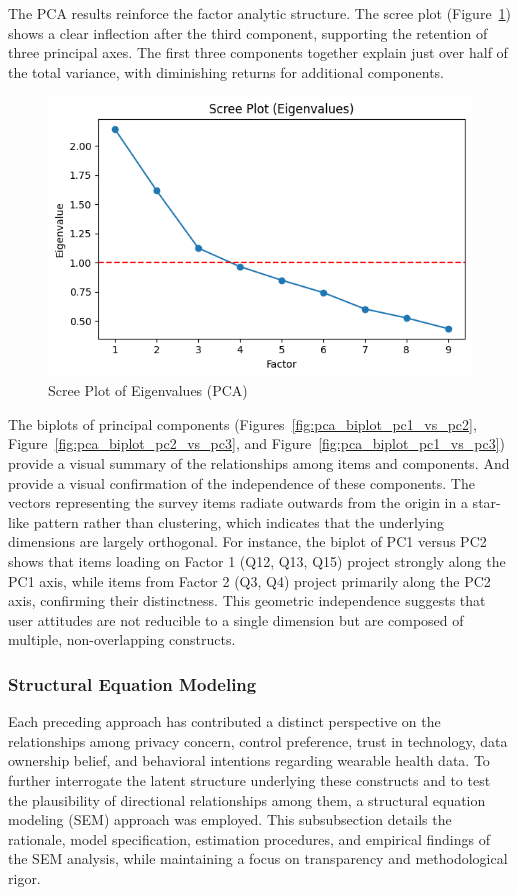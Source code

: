 	The PCA results reinforce the factor analytic structure. The scree plot (Figure~\ref{fig:scree_plot}) shows a clear inflection after the third component, supporting the retention of three principal axes. The first three components together explain just over half of the total variance, with diminishing returns for additional components.
	\begin{figure}[ht]\centering
		\includegraphics[width=0.7\linewidth]{figures/img/factor_analysis/scree_plot.png}
		\caption{Scree Plot of Eigenvalues (PCA)}
		\label{fig:scree_plot}
	\end{figure}
	The biplots of principal components (Figures~\ref{fig:pca_biplot_pc1_vs_pc2}, Figure~\ref{fig:pca_biplot_pc2_vs_pc3}, and Figure~\ref{fig:pca_biplot_pc1_vs_pc3}) provide a visual summary of the relationships among items and components. And provide a visual confirmation of the independence of these components. The vectors representing the survey items radiate outwards from the origin in a star-like pattern rather than clustering, which indicates that the underlying dimensions are largely orthogonal. For instance, the biplot of PC1 versus PC2 shows that items loading on Factor 1 (Q12, Q13, Q15) project strongly along the PC1 axis, while items from Factor 2 (Q3, Q4) project primarily along the PC2 axis, confirming their distinctness. This geometric independence suggests that user attitudes are not reducible to a single dimension but are composed of multiple, non-overlapping constructs.
	\subsubsection{Structural Equation Modeling}
	Each preceding approach has contributed a distinct perspective on the relationships among privacy concern, control preference, trust in technology, data ownership belief, and behavioral intentions regarding wearable health data. To further interrogate the latent structure underlying these constructs and to test the plausibility of directional relationships among them, a structural equation modeling (SEM) approach was employed. This subsubsection details the rationale, model specification, estimation procedures, and empirical findings of the SEM analysis, while maintaining a focus on transparency and methodological rigor.

